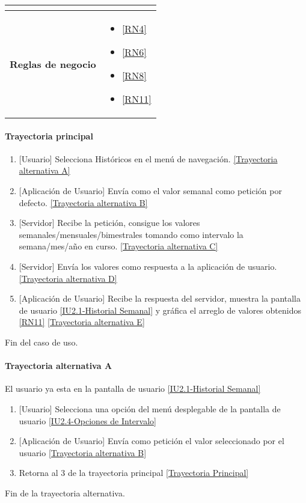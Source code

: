 \begin{longtable}{|J{5cm}|J{10.3cm}|}
\begin{itemize}
		\end{itemize} \\ \hline
	\textbf{Reglas de negocio} & 
		\begin{itemize}
		    \item \ref{RN4}
		    \item \ref{RN6}
			\item \ref{RN8}
			\item \ref{RN11}
		\end{itemize} \\ \hline

\end{longtable}

\paragraph{Trayectoria principal}
    \label{SUB-M-CU1.5:TP}
	\begin{enumerate}
	    \item {[Usuario]} Selecciona Históricos en el menú de navegación. \hyperref[SUB-M-CU6:TA]{[Trayectoria alternativa A]} 
		\item {[Aplicación de Usuario]} Envía como el valor semanal como petición por defecto. \hyperref[SUB-M-CU6:TB]{[Trayectoria alternativa B]} 
		\item {[Servidor]} Recibe la petición, consigue los valores semanales/mensuales/bimestrales tomando como intervalo la semana/mes/año en curso. \hyperref[SUB-M-CU6:TC]{[Trayectoria alternativa C]} 
		\item {[Servidor]} Envía los valores como respuesta a la aplicación de usuario. \hyperref[SUB-M-CU6:TD]{[Trayectoria alternativa D]}
        \item {[Aplicación de Usuario]} Recibe la respuesta del servidor, muestra la pantalla de usuario \hyperref[fig:Historial Semanal]{[IU2.1-Historial Semanal]} y gráfica el arreglo de valores obtenidos \ref{RN11} \hyperref[SUB-M-CU6:TE]{[Trayectoria alternativa E]}
	\end{enumerate}
	Fin del caso de uso.

\paragraph{Trayectoria alternativa A} \label{SUB-M-CU6:TA}
    El usuario ya esta en la pantalla de usuario \hyperref[fig:Historial Semanal]{[IU2.1-Historial Semanal]}
	\begin{enumerate}[label=A\arabic*.]
	    \item {[Usuario]} Selecciona una opción del menú desplegable de la pantalla de usuario \hyperref[fig:Opciones de Intervalo]{[IU2.4-Opciones de Intervalo]}
	    \item {[Aplicación de Usuario]} Envía como petición el valor seleccionado por el usuario \hyperref[SUB-M-CU6:TB]{[Trayectoria alternativa B]} 
	    \item Retorna al 3 de la trayectoria principal \hyperref[SUB-M-CU6:TP]{[Trayectoria Principal]}
	\end{enumerate}
	Fin de la trayectoria alternativa.
	
